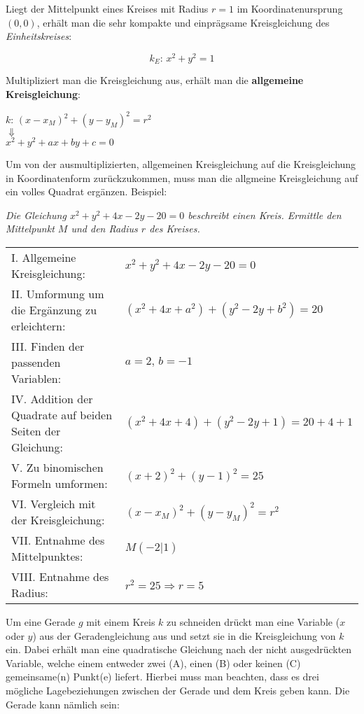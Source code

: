 Liegt der Mittelpunkt eines Kreises mit Radius $r = 1$ im Koordinatenursprung $(0, 0)$, erh\"{a}lt man die sehr kompakte und einpr\"{a}gsame Kreisgleichung des \emph{Einheitskreises}:

$$k_{E}:\,x^2 + y^2 = 1$$

Multipliziert man die Kreisgleichung aus, erh\"{a}lt man die \textbf{allgemeine Kreisgleichung}:

\begin{center}
	$k:\, (x - x_{M})^2 + (y - y_{M})^2 = r^2$\\
	$\Downarrow$\\
	$x^2 + y^2 + ax + by + c = 0$
\end{center}

\pagebreak

Um von der ausmultiplizierten, allgemeinen Kreisgleichung auf die Kreisgleichung in Koordinatenform zur\"{u}ckzukommen, muss man die allgmeine Kreisgleichung auf ein volles Quadrat erg\"{a}nzen. Beispiel: \par

\emph{Die Gleichung $x^2 + y^2 + 4x - 2y - 20 = 0$ beschreibt einen Kreis. Ermittle den Mittelpunkt $M$ und den Radius $r$ des Kreises.}

\begin{tabular}{l l}
	I. Allgemeine Kreisgleichung: & $x^2 + y^2 + 4x - 2y - 20 = 0$
	\\
	II. Umformung um die Erg\"{a}nzung zu erleichtern: & $(x^2 + 4x + a^2) + (y^2 - 2y + b^2) = 20$
	\\
	III. Finden der passenden Variablen: & $a = 2,\, b = -1$
	\\
	IV. Addition der Quadrate auf beiden Seiten der Gleichung: & $(x^2 + 4x + 4) + (y^2 - 2y + 1) = 20 + 4 + 1$
	\\
	V. Zu binomischen Formeln umformen: & $(x + 2)^2 + (y - 1)^2 = 25$
	\\
	VI. Vergleich mit der Kreisgleichung: & $(x - x_{M})^2 + (y - y_{M})^2 = r^2$
	\\
	VII. Entnahme des Mittelpunktes: & $M (-2 | 1)$
	\\
	VIII. Entnahme des Radius: & $r^2 = 25 \Rightarrow r = 5$
\end{tabular}


Um eine Gerade $g$ mit einem Kreis $k$ zu schneiden dr\"{u}ckt man eine Variable ($x$ oder $y$) aus der Geradengleichung aus und setzt sie in die Kreisgleichung von $k$ ein. Dabei erh\"{a}lt man eine quadratische Gleichung nach der nicht ausgedr\"{u}ckten Variable, welche einem entweder zwei (A), einen (B) oder keinen (C) gemeinsame(n) Punkt(e) liefert. Hierbei muss man beachten, dass es drei m\"{o}gliche Lagebeziehungen zwischen der Gerade und dem Kreis geben kann. Die Gerade kann n\"{a}mlich sein:

